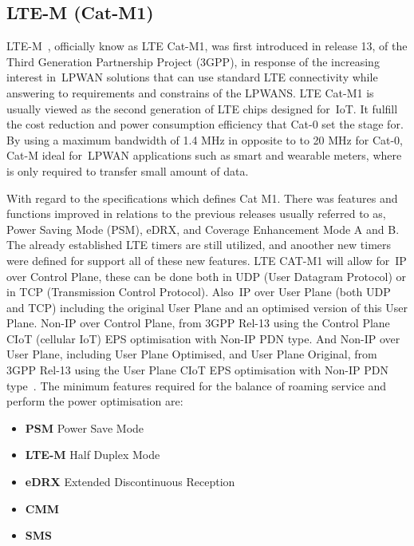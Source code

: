 \newpage
\subsection{LTE-M (Cat-M1)} %
\label{sec:catm1_sota}


LTE-M~\cite{LTE-M}, officially know as LTE Cat-M1, was first introduced in release 13, of the Third Generation Partnership Project (3GPP), in response of the increasing interest in~\gls{LPWAN} solutions that can use standard LTE connectivity while answering to requirements and constrains of the LPWANS.
LTE Cat-M1 is usually  viewed as the second generation of LTE chips designed for~\gls{IoT}. It fulfill the cost reduction and power consumption efficiency  that Cat-0 set the stage for. 
By using a  maximum bandwidth of 1.4 MHz in opposite to to 20 MHz for Cat-0, Cat-M ideal for~\gls{LPWAN} applications such as  smart and wearable meters, where is only required to transfer small amount of data.

With regard to the specifications  which defines Cat M1. There was features and functions improved in relations to the previous releases usually referred to as, Power Saving Mode (PSM), eDRX, and  Coverage Enhancement Mode A and B. The already established LTE timers are still utilized, and anoother new timers were defined for support all of these new features.
LTE CAT-M1 will allow for~\gls{IP} over Control Plane, these can be done  both in UDP (User Datagram Protocol) or in  TCP (Transmission Control Protocol).
Also~\gls{IP} over User Plane (both UDP and TCP) including the original User Plane and an optimised version of this User Plane.
Non-IP over Control Plane, from 3GPP Rel-13 using the Control Plane CIoT (cellular IoT) EPS optimisation with Non-IP PDN type. 
And Non-IP over User Plane, including User Plane Optimised, and User Plane Original, from 3GPP Rel-13 using the User Plane CIoT EPS optimisation with Non-IP PDN type~\cite{LTE-M}. 
The  minimum features required for the balance of roaming service  and perform the power optimisation are:
\begin{itemize}
	\item \textbf{PSM } Power Save Mode
	\item \textbf{LTE-M} Half Duplex Mode
	\item \textbf{eDRX } Extended Discontinuous Reception
	\item \textbf{CMM } 
	\item \textbf{SMS} 
\end{itemize} 


